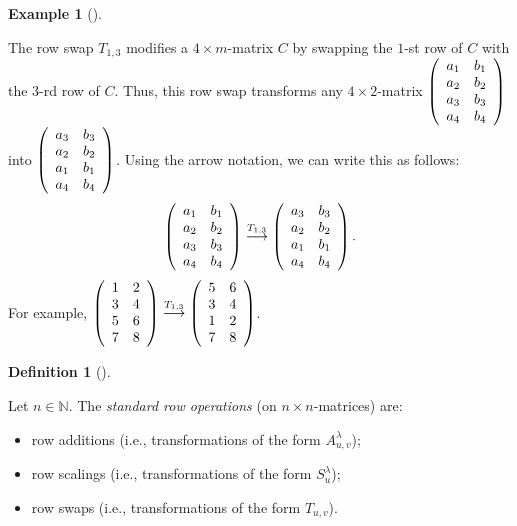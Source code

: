 \documentclass[numbers=enddot,12pt,final,onecolumn,notitlepage]{scrartcl}%
\theoremstyle{definition}
\newtheorem{defi}[theo]{Definition}
\newenvironment{definition}[1][]
{\begin{defi}[#1]\begin{leftbar}}
{\end{leftbar}\end{defi}}
\newtheorem{exam}[theo]{Example}
\newenvironment{example}[1][]
{\begin{exam}[#1]\begin{leftbar}}
{\end{leftbar}\end{exam}}
\begin{document}
\begin{example}
The row swap $T_{1,3}$ modifies a $4\times m$-matrix $C$ by swapping the
$1$-st row of $C$ with the $3$-rd row of $C$. Thus, this row swap transforms
any $4\times2$-matrix $\left(
\begin{array}
[c]{cc}%
a_{1} & b_{1}\\
a_{2} & b_{2}\\
a_{3} & b_{3}\\
a_{4} & b_{4}%
\end{array}
\right)  $ into $\left(
\begin{array}
[c]{cc}%
a_{3} & b_{3}\\
a_{2} & b_{2}\\
a_{1} & b_{1}\\
a_{4} & b_{4}%
\end{array}
\right)  $. Using the arrow notation, we can write this as follows:%
\[
\left(
\begin{array}
[c]{cc}%
a_{1} & b_{1}\\
a_{2} & b_{2}\\
a_{3} & b_{3}\\
a_{4} & b_{4}%
\end{array}
\right)  \overset{T_{1,3}}{\longrightarrow}\left(
\begin{array}
[c]{cc}%
a_{3} & b_{3}\\
a_{2} & b_{2}\\
a_{1} & b_{1}\\
a_{4} & b_{4}%
\end{array}
\right)  .
\]
For example, $\left(
\begin{array}
[c]{cc}%
1 & 2\\
3 & 4\\
5 & 6\\
7 & 8
\end{array}
\right)  \overset{T_{1,3}}{\longrightarrow}\left(
\begin{array}
[c]{cc}%
5 & 6\\
3 & 4\\
1 & 2\\
7 & 8
\end{array}
\right)  $.
\end{example}

\begin{definition}
Let $n\in\mathbb{N}$. The \textit{standard row operations} (on $n\times
n$-matrices) are:

\begin{itemize}
\item row additions (i.e., transformations of the form $A_{u,v}^{\lambda}$);

\item row scalings (i.e., transformations of the form $S_{u}^{\lambda}$);

\item row swaps (i.e., transformations of the form $T_{u,v}$).
\end{itemize}
\end{definition}
\end{document}

